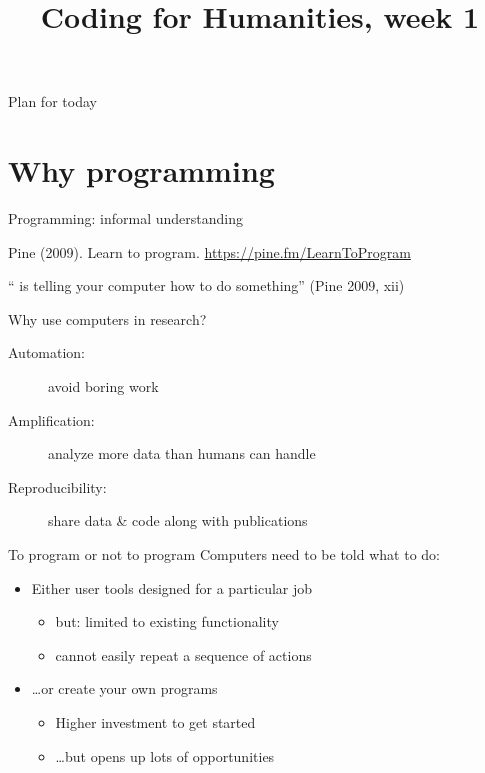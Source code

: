 \documentclass[aspectratio=169,usenames,dvipsnames]{beamer}
\title{Coding for Humanities, week 1}
\begin{document}
\begin{frame}
 \titlepage
\end{frame}

\begin{frame}{Plan for today}
 \tableofcontents
\end{frame}




\section{Why programming}
\frame{\tableofcontents[currentsection]}
\begin{frame}{Programming: informal understanding}
    \begin{reference}
        Pine (2009). Learn to program. \url{https://pine.fm/LearnToProgram}
    \end{reference}
    \begin{definition}
        `` is telling your computer
        how to do something'' (Pine 2009, xii)
    \end{definition}
\end{frame}

\begin{frame}{Why use computers in research?}
	\pause

    \begin{description}
        \item[Automation:] avoid boring work
        \item[Amplification:] analyze more data than humans can handle
        \item[Reproducibility:] share data \& code along with publications
    \end{description}
\end{frame}

\begin{frame}{To program or not to program}
    Computers need to be told what to do:

    \begin{itemize}
        \item Either user tools designed for a particular job
            \begin{itemize}
                \item but: limited to existing functionality
                \item cannot easily repeat a sequence of actions
            \end{itemize}

        \item \dots or create your own programs
            \begin{itemize}
                \item Higher investment to get started
                \item \dots but opens up lots of opportunities
            \end{itemize}
    \end{itemize}
\end{frame}
\end{document}
